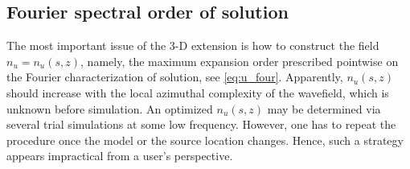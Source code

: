 \documentclass[extra,referee]{gji}
\begin{document}
\subsection{Fourier spectral order of solution}
The most important issue of the 3-D extension is how to construct the field  
$n_u=n_u\left(s,z\right)$, namely, the maximum expansion order prescribed pointwise on
the Fourier characterization of solution, see \eqref{eq:u_four}. 
Apparently, $n_u\left(s,z\right)$ should increase with the local
azimuthal complexity of the wavefield, which is unknown before simulation. 
An optimized $n_u\left(s,z\right)$ may be determined via several trial 
simulations at some low frequency. However, one has to repeat 
the procedure once the model or the source location changes.
Hence, such a strategy appears impractical from a user's perspective.
\end{document}
